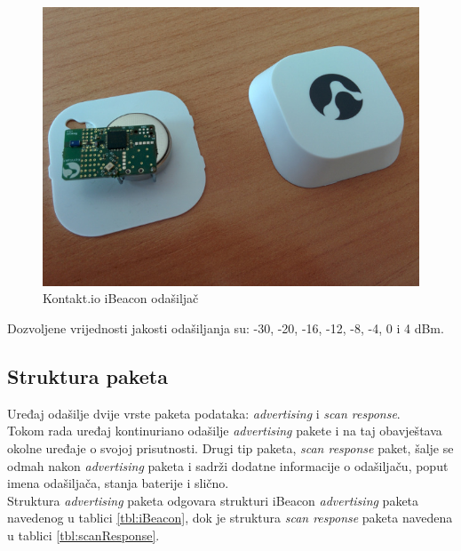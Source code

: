 \begin{figure}[H]
    \centering
    \includegraphics[scale=0.55]{pictures/ibeacon}
    \caption{Kontakt.io iBeacon odašiljač}
\end{figure}

Dozvoljene vrijednosti jakosti odašiljanja su: -30, -20, -16, -12, -8, -4, 0 i 4 dBm.


\subsection{Struktura paketa}

Uređaj odašilje dvije vrste paketa podataka: \textit{advertising} i \textit{scan response}.
\\
Tokom rada uređaj kontinuriano odašilje \textit{advertising} pakete i na taj obavještava okolne uređaje o svojoj prisutnosti. 
Drugi tip paketa, \textit{scan response} paket, šalje se odmah nakon \textit{advertising} paketa i sadrži dodatne informacije o odašiljaču, poput imena odašiljača, stanja baterije i slično.
\\

Struktura \textit{advertising} paketa odgovara strukturi iBeacon \textit{advertising} paketa navedenog u tablici \ref{tbl:iBeacon}, dok je struktura \textit{scan response} paketa navedena u tablici \ref{tbl:scanResponse}.
\\


